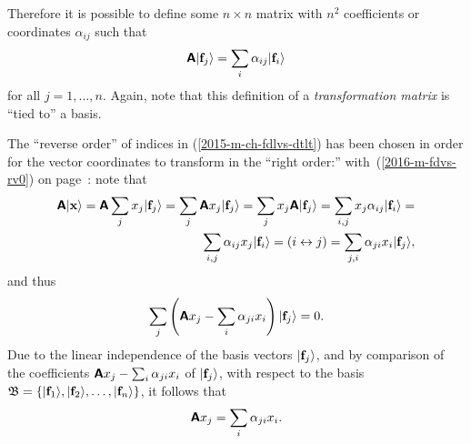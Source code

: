Therefore it is possible to define some $n \times n$ matrix with $n^2$ coefficients or coordinates
$\alpha_{ij}$ such that
\begin{equation}
\textsf{\textbf{A}}\vert  {\bf f}_j \rangle = \sum_i \alpha_{ij}\vert {\bf f}_i  \rangle
\label{2015-m-ch-fdlvs-dtlt}
\end{equation}
for all $j=1,\ldots ,n$.
Again, note that this definition of a {\em transformation matrix}
is ``tied to'' a basis.


The ``reverse order'' of indices in (\ref{2015-m-ch-fdlvs-dtlt}) has been chosen
in order for the vector coordinates to transform in the ``right order:''
with~(\ref{2016-m-fdvs-rv0}) on page~\pageref{2016-m-fdvs-rv0}: note that
\begin{equation}
\begin{split}
\textsf{\textbf{A}}\vert  {\bf x} \rangle =
\textsf{\textbf{A}} \sum_j x_j \vert  {\bf f}_j \rangle =
\sum_j \textsf{\textbf{A}} x_j \vert  {\bf f}_j \rangle =
\sum_j x_j \textsf{\textbf{A}} \vert  {\bf f}_j \rangle =
\sum_{i,j} x_j \alpha_{ij} \vert  {\bf f}_i \rangle =  \\
\sum_{i,j} \alpha_{ij}  x_j \vert  {\bf f}_i \rangle =
(i\leftrightarrow j) =
\sum_{j,i} \alpha_{ji}  x_i \vert  {\bf f}_j \rangle ,
\end{split}
\label{2016-m-ch-fdlvs-dtltk}
\end{equation}
and thus
\begin{equation}
\begin{split}
\sum_j
\left(
\textsf{\textbf{A}} x_j
-
\sum_{i} \alpha_{ji}  x_i
\right)
\vert  {\bf f}_j \rangle
=0
 .
\end{split}
\label{2016-m-ch-fdlvs-dtltk2}
\end{equation}
Due to the linear independence of the basis vectors  $\vert  {\bf f}_j \rangle$, and by comparison of the coefficients
$\textsf{\textbf{A}} x_j
-
\sum_{i} \alpha_{ji}  x_i    $
of $\vert  {\bf f}_j \rangle$,
with respect to  the basis
${\frak B}=\{\vert {\bf f}_1 \rangle ,\vert {\bf f}_2 \rangle,\ldots ,\vert {\bf f}_n \rangle\}$,
it follows that
\begin{equation}
\textsf{\textbf{A}} x_j = \sum_{i} \alpha_{ji}  x_i  .
\label{2016-m-ch-fdlvs-dtltk1}
\end{equation}


